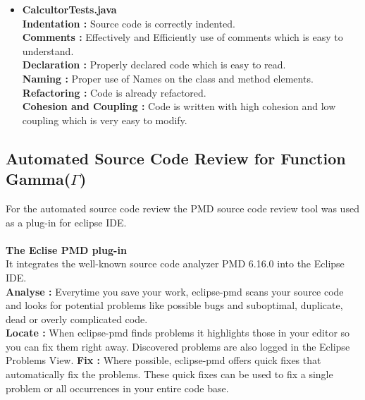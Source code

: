 \documentclass[12pt]{report}
\begin{document}
{\begin{itemize}
    \textbf{Indentation : }Source code is correctly indented.\\
    \textbf{Comments : }Effectively and Efficiently use of comments which is easy to understand.\\
    \textbf{Declaration : }Properly declared code which is easy to read.\\
    \textbf{Naming : }Proper use of Names on the class and method elements.\\
\textbf{Refactoring : }Refactoring can be applied to improve code quality. In one method called arithmeticOperation on the line 110, duplicate conditional fragment can be moved outside expression. \\
\textbf{Cohesion and Coupling : }Code is written with high cohesion and low coupling which is very easy to modify.

    
    \item \textbf{CalcultorTests.java}\\
    \textbf{Indentation : } Source code is correctly indented.\\
    \textbf{Comments : }Effectively and Efficiently use of comments which is easy to understand.\\
    \textbf{Declaration : }Properly declared code which is easy to read.\\
    \textbf{Naming : }Proper use of Names on the class and method elements.\\
\textbf{Refactoring : }Code is already refactored. \\
\textbf{Cohesion and Coupling : }Code is written with high cohesion and low coupling which is very easy to modify.
\end{itemize} 

\clearpage
\subsection{Automated Source Code Review for Function Gamma($\Gamma$)}

For the automated source code review the PMD source code review tool was used as a plug-in for eclipse IDE.\\\\
\textbf{The Eclise PMD plug-in }\\
It integrates the well-known source code analyzer PMD 6.16.0 into the Eclipse IDE.\\
\textbf{Analyse : }Everytime you save your work, eclipse-pmd scans your source code and looks for potential problems like possible bugs and suboptimal, duplicate, dead or overly complicated code.\\
\textbf{Locate : }When eclipse-pmd finds problems it highlights those in your editor so you can fix them right away. Discovered problems are also logged in the Eclipse Problems View.
\textbf{Fix : }Where possible, eclipse-pmd offers quick fixes that automatically fix the problems. These quick fixes can be used to fix a single problem or all occurrences in your entire code base.

}
\end{document}
